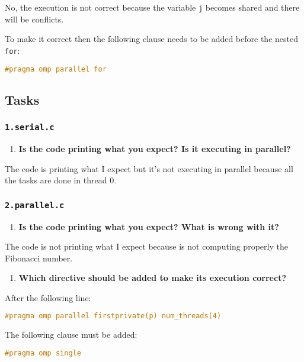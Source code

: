\documentclass[a4paper]{article}
\begin{document}
No, the execution is not correct because the variable \verb|j| becomes shared and there will be conflicts.

To make it correct then the following clause needs to be added before the nested \verb|for|:

\begin{lstlisting}[language=C]
#pragma omp parallel for
\end{lstlisting}

\subsection{Tasks}
\subsubsection{\texttt{1.serial.c}}

\begin{enumerate}
	\item \textbf{Is the code printing what you expect? Is it executing in parallel?}
\end{enumerate}

The code is printing what I expect but it's not executing in parallel because all the tasks are done in thread 0.

\subsubsection{\texttt{2.parallel.c}}
\begin{enumerate}
	\item \textbf{Is the code printing what you expect? What is wrong with it?}
\end{enumerate}

The code is not printing what I expect because is not computing properly the Fibonacci number. 

\begin{enumerate}[resume]
	\item \textbf{Which directive should be added to make its execution correct?}
\end{enumerate}

After the following line:
\begin{lstlisting}[language=C]
#pragma omp parallel firstprivate(p) num_threads(4)
\end{lstlisting}

The following clause must be added:
\begin{lstlisting}[language=C]
#pragma omp single
\end{lstlisting}
\end{document}
